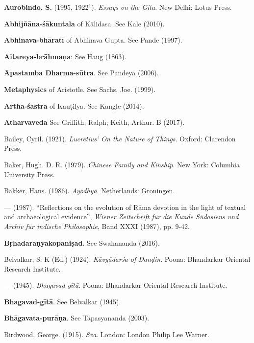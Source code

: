 \begin{thebibliography}{99}
\label{bibliography}
\itemsep=2pt
{\bf Aurobindo, S.} (1995, 1922$^{1}$). {\sl Essays on the Gita}. New Delhi: Lotus Press. 

{\bf Abhijñāna-śākuntala} of Kālidasa. See Kale (2010). 

{\bf Abhinava-bhāratī} of Abhinava Gupta. See Pande (1997).

{\bf Aitareya-brāhmaṇa}: See Haug (1863).

{\bf Āpastamba Dharma-sūtra}. See Pandeya (2006).

{\bf Metaphysics} of Aristotle. See Sachs, Joe. (1999).

{\bf Artha-śāstra} of Kauṭilya. See Kangle (2014).  

{\bf Atharvaveda} See Griffith, Ralph; Keith, Arthur. B (2017).

Bailey, Cyril. (1921). {\sl Lucretius’ On the Nature of Things}. Oxford: Clarendon Press. 

Baker, Hugh. D. R. (1979). {\sl Chinese Family and Kinship}. New York: Columbia University Press. 

Bakker, Hans. (1986). {\sl Ayodhyā}. Netherlands: Groningen. 

--- (1987). “Reflections on the evolution of Rāma devotion in the light of textual and archaeological evidence”, {\sl Wiener Zeitschrift für die Kunde Südasiens und Archiv für indische Philosophie}, Band XXXI (1987), pp. 9-42. 

{\bf Bṛhadāraṇyakopaniṣad}. See Swahananda (2016).

Belvalkar, S. K (Ed.) (1924). {\sl Kāvyādarśa of Danḍin}.  Poona: Bhandarkar Oriental Research Institute. 

--- (1945). {\sl Bhagavad-gītā}. Poona: Bhandarkar Oriental Research Institute. 

{\bf Bhagavad-gītā}. See Belvalkar (1945).

{\bf Bhāgavata-purāṇa}. See Tapasyananda (2003). 

Birdwood, George. (1915). {\sl Sva}. London: London Philip Lee Warner. 


\end{thebibliography}
